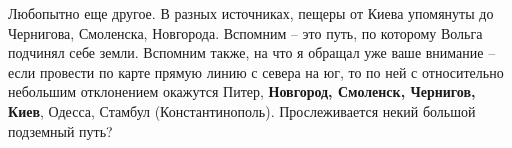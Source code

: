 Любопытно еще другое. В разных источниках, пещеры от Киева упомянуты до Чернигова, Смоленска, Новгорода. Вспомним – это путь, по которому Вольга подчинял себе земли. Вспомним также, на что я обращал уже ваше внимание – если провести по карте прямую линию с севера на юг, то по ней с относительно небольшим отклонением окажутся Питер, \textbf{Новгород, Смоленск, Чернигов, Киев}, Одесса, Стамбул (Константинополь). Прослеживается некий большой подземный путь?

